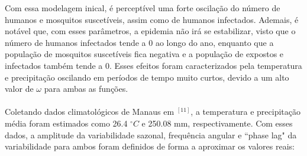 \documentclass[12pt]{article}
\begin{document}
Com essa modelagem inical, é perceptível uma forte oscilação do número de humanos e mosquitos suscetíveis, assim como de humanos infectados. Ademais, é notável que, com esses parâmetros, a epidemia não irá se estabilizar, visto que o número de humanos infectados tende a 0 ao longo do ano, enquanto que a população de mosquitos suscetíveis fica negativa e a população de expostos e infectados também tende a 0. Esses efeitos foram caracterizados pela temperatura e precipitação oscilando em períodos de tempo muito curtos, devido a um alto valor de $\omega$ para ambas as funções. 
\\\\Coletando dados climatológicos de Manaus em $^{[11]}$, a temperatura e precipitação média foram estimados como 26.4 $^\circ C$ e 250.08 mm, respectivamente. Com esses dados, a amplitude da variabilidade sazonal, frequência angular e ``phase lag" da variabilidade para ambos foram definidos de forma a aproximar os valores reais:
\end{document}
